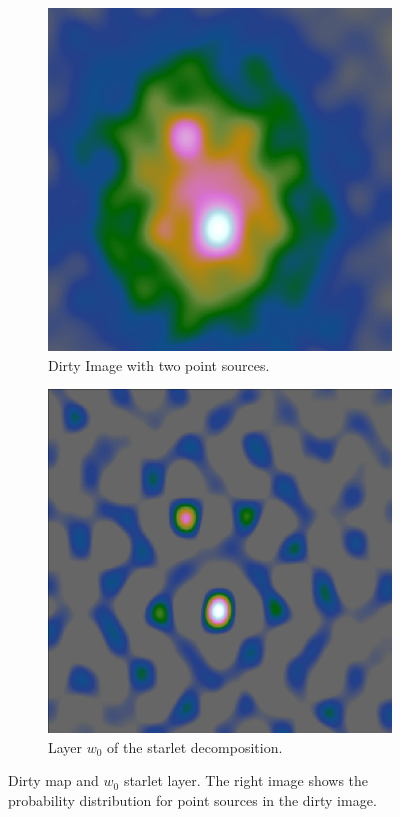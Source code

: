 \begin{figure}[h]
	\centering
	\begin{subfigure}[b]{0.4\linewidth}
		\includegraphics[width=\linewidth]{./chapters/05.algorithms/starlets/dirty2.png}
		\caption{Dirty Image with two point sources.}
		\label{cd:heuristic:dirty}
	\end{subfigure}
	\begin{subfigure}[b]{0.4\linewidth}
		\includegraphics[width=\linewidth]{./chapters/05.algorithms/starlets/starlet0_2.png}
		\caption{Layer $w_0$ of the starlet decomposition.}
		\label{cd:heuristic:starlet}
	\end{subfigure}
	\caption{Dirty map and $w_0$ starlet layer. The right image shows the probability distribution for point sources in the dirty image.}
	\label{cd:heuristic:figure}
\end{figure}


